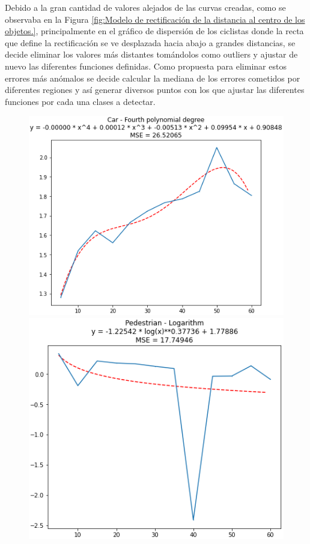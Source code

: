 Debido a la gran cantidad de valores alejados de las curvas creadas, como se observaba en la Figura \ref{fig:Modelo de rectificación de la distancia al centro de los objetos.}, principalmente en el gráfico de dispersión de los ciclistas donde la recta que define la rectificación se ve desplazada hacia abajo a grandes distancias, se decide eliminar los valores más distantes tomándolos como outliers y ajustar de nuevo las diferentes funciones definidas. Como propuesta para eliminar estos errores más anómalos se decide calcular la mediana de los errores cometidos por diferentes regiones y así generar diversos puntos con los que ajustar las diferentes funciones por cada una clases a detectar.

\begin{figure}[H]
	\begin{minipage}{0.32\textwidth}
		\centering
		\includegraphics[width=1\linewidth]{Book/figures/6_approx_distancia/rectification2_lidar_car.png}
	\end{minipage}\hfill
	\begin{minipage}{0.32\textwidth}
		\centering
		\includegraphics[width=1\linewidth]{Book/figures/6_approx_distancia/rectification2_lidar_pedestrian.png}

\end{minipage}
\end{figure}
